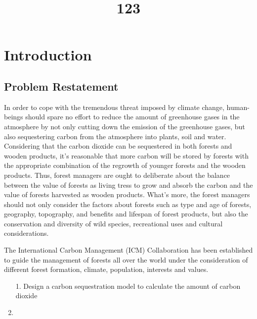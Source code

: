 \documentclass{mcmthesis}
\title{123}
\numberwithin{figure}{section}
\numberwithin{table}{section}
\numberwithin{equation}{section}
\begin{document}
\renewcommand{\algorithmicrequire}{\textbf{Input:}}  %
\renewcommand{\algorithmicensure}{\textbf{Output:}} %
\begin{abstract}



\begin{keywords}
\end{keywords}
\end{abstract}
\maketitle

\tableofcontents
  \thispagestyle{empty}
  \newpage
  \setcounter{page}{1}

\section{Introduction}

\subsection{Problem Restatement}
In order to cope with the tremendous threat imposed by climate change, human-beings should 
spare no effort to reduce the amount of greenhouse gases in the atmosphere by not only cutting
down the emission of the greenhouse gases, but also sequestering carbon from the atmosphere into
plants, soil and water. Considering that the carbon dioxide can be sequestered in both forests 
and wooden products, it's reasonable that more carbon will be stored by forests with the 
appropriate combination of the regrowth of younger forests and the wooden products.
Thus, forest managers are ought to deliberate about the balance between the value of forests 
as living tress to grow and absorb the carbon and the value of forests harvested as wooden products.
What's more, the forest managers should not only consider the factors about forests such as 
type and age of forests, geography, topography, and benefits and lifespan of forest products,
but also the conservation and diversity of wild species, recreational uses and cultural considerations.
\par
The International Carbon Management (ICM) Collaboration has been established to guide the management
of forests all over the world under the consideration of different forest formation, climate, 
population, interests and values.
\begin{enumerate}
    \item [1.] Design a carbon sequestration model to calculate the amount of carbon dioxide 
    
    \item 
\end{enumerate}
\end{document}
